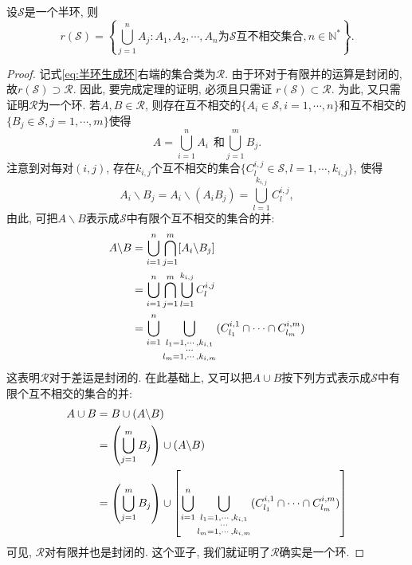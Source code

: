 \begin{theorem}
	设$\mathscr{S}$是一个半环, 则
	\begin{equation}\label{eq:半环生成环}
	r(\mathscr{S}) = \left\{ \bigcup_{j=1}^nA_j: A_1,A_2,\cdots,A_n\text{为}\mathscr{S}\text{互不相交集合}, n\in\mathbb{N}^*  \right\}.
	\end{equation}
\end{theorem}

\begin{proof}
	记式\ref{eq:半环生成环}右端的集合类为$\mathscr{R}$. 由于环对于有限并的运算是封闭的, 故$r(\mathscr{S})\supset \mathscr{R}$. 因此, 要完成定理的证明, 必须且只需证 $r(\mathscr{S})\subset \mathscr{R}$. 为此, 又只需证明$\mathscr{R}$为一个环. 若$A,B\in\mathscr{R}$, 则存在互不相交的$\{A_i\in\mathscr{S},i=1,\cdots,n  \}$和互不相交的$\{B_j\in\mathscr{S},j=1,\cdots,m \}$使得
	\begin{equation}
		A = \bigcup_{i=1}^{n}A_i~~\text{和}\bigcup_{j=1}^{m}B_j.
	\end{equation}
	注意到对每对$(i,j)$, 存在$k_{i,j}$个互不相交的集合$\{C_l^{i,j}\in\mathscr{S},l=1,\cdots,k_{i,j}\}$, 使得
	\begin{equation}
		A_i\backslash B_j = A_i\backslash(A_iB_j) = \bigcup_{l=1}^{k_{i,j}}C_l^{i,j},
	\end{equation}
	由此, 可把$A\backslash B$表示成$\mathscr{S}$中有限个互不相交的集合的并:
	\begin{align}
		A\backslash B &= \bigcup_{i=1}^n\bigcap_{j=1}^m [A_i\backslash B_j]\nonumber\\
		&= \bigcup_{i=1}^n\bigcap_{j=1}^m \bigcup_{l=1}^{k_{i,j}}C_l^{i,j}\nonumber\\
		&= \bigcup_{i=1}^n\bigcup_{
			\begin{subarray}{c}
			l_1 = 1,\cdots,k_{i,1}\\
			\cdots\\
			l_m = 1,\cdots,k_{i,m}
			\end{subarray}
		}(C_{l_1}^{i,1}\cap\cdots\cap C_{l_m}^{i,m})
	\end{align}
	这表明$\mathscr{R}$对于差运是封闭的. 在此基础上, 又可以把$A\cup B$按下列方式表示成$\mathscr{S}$中有限个互不相交的集合的并:
	\begin{align}
		A\cup B &= B\cup (A\backslash B)\nonumber\\
		&= \left(\bigcup_{j=1}^m B_j\right)\cup (A\backslash B)\nonumber\\
		&=\left(\bigcup_{j=1}^m B_j\right)\cup\left[ \bigcup_{i=1}^n\bigcup_{
			\begin{subarray}{c}
			l_1 = 1,\cdots,k_{i,1}\\
			\cdots\\
			l_m = 1,\cdots,k_{i,m}
			\end{subarray}
		}(C_{l_1}^{i,1}\cap\cdots\cap C_{l_m}^{i,m}) \right]
	\end{align}
	可见, $\mathscr{R}$对有限并也是封闭的. 这个亚子, 我们就证明了$\mathscr{R}$确实是一个环.
\end{proof}

